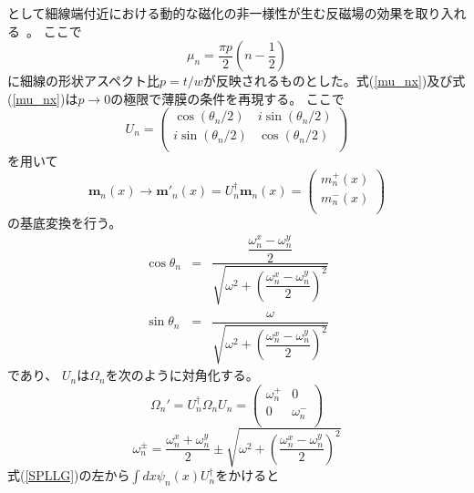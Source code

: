 として細線端付近における動的な磁化の非一様性が生む反磁場の効果を取り入れる~\cite{Guslienko}。
ここで
\begin{equation}
\mu_n=\frac{\pi p}{2}\left(n-\frac{1}{2}\right)
\end{equation}
に細線の形状アスペクト比$p=t/w$が反映されるものとした。式(\ref{mu_nx})及び式(\ref{mu_nx})は$p\rightarrow 0$の極限で薄膜の条件を再現する。
ここで
\begin{equation}
{U_n} = \left( {\begin{array}{*{20}{c}}
   {\cos (\theta _n/2) }& {i\sin (\theta _n/2)}  \\
   {i\sin (\theta _n/2)} & {\cos (\theta _n/2)}  \\
\end{array}} \right)\label{henkangyoretu}
\end{equation}を用いて
\begin{equation}
{\bm{m}_n}(x) \to {\bm{m}'_n}(x) = {U_n^\dag}{\bm{m}_n}(x) = \left( {\begin{array}{*{20}{c}}
   {m_n^ + (x)}  \\
   {m_n^ - (x)}  \\
\end{array}} \right)\label{trans}
\end{equation}
の基底変換を行う。
\begin{eqnarray}
 \cos {\theta _n} &= &\dfrac{{\dfrac{{\omega _n^x - \omega _n^y}}{2}}}{{\sqrt {{\omega ^2} + {{\left( {\dfrac{{\omega _n^x - \omega _n^y}}{2}} \right)}^2}} }} \\ 
 \sin {\theta _n} &= &\dfrac{\omega }{{\sqrt {{\omega ^2} + {{\left( {\dfrac{{\omega _n^x - \omega _n^y}}{2}} \right)}^2}} }} \label{sincos}
\end{eqnarray}
であり、
$U_n$は$\Omega_n$を次のように対角化する。
\begin{equation}
{\Omega _n'} = {U_n^\dag}{\Omega _n}U_n  = \left( {\begin{array}{*{20}{c}}
   {\omega _n^ + } & 0  \\
   0 & {\omega _n^ - }  \\
\end{array}} \right)
\end{equation}
\begin{equation}
\omega _n^ \pm  = \frac{{{\omega _n^x} + {\omega _n^y}}}{2} \pm \sqrt {{\omega ^2} + {{\left( {\frac{{{\omega _n^x} - {\omega _n^y}}}{2}} \right)}^2}} 
\end{equation}
式(\ref{SPLLG})の左から$\displaystyle \int d x{\psi _n}(x){U_n^\dag}$をかけると
